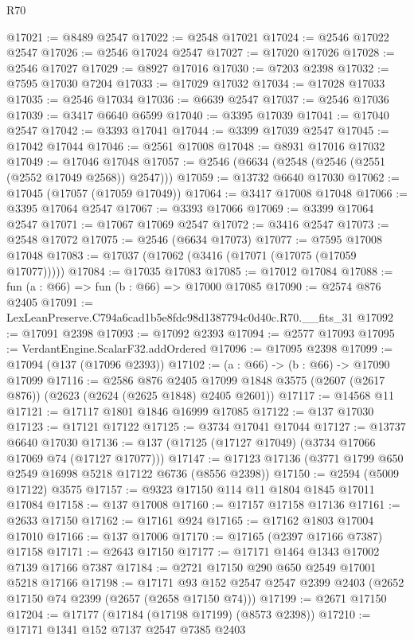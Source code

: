 \begin{lexlean}{R70}
\begin{coremodule}
@17021 := @8489 @2547
@17022 := @2548 @17021
@17024 := @2546 @17022 @2547
@17026 := @2546 @17024 @2547
@17027 := @17020 @17026
@17028 := @2546 @17027
@17029 := @8927 @17016
@17030 := @7203 @2398
@17032 := @7595 @17030 @7204
@17033 := @17029 @17032
@17034 := @17028 @17033
@17035 := @2546 @17034
@17036 := @6639 @2547
@17037 := @2546 @17036
@17039 := @3417 @6640 @6599
@17040 := @3395 @17039
@17041 := @17040 @2547
@17042 := @3393 @17041
@17044 := @3399 @17039 @2547
@17045 := @17042 @17044
@17046 := @2561 @17008
@17048 := @8931 @17016 @17032
@17049 := @17046 @17048
@17057 := @2546 (@6634 (@2548 (@2546 (@2551 (@2552 @17049 @2568)) @2547)))
@17059 := @13732 @6640 @17030
@17062 := @17045 (@17057 (@17059 @17049))
@17064 := @3417 @17008 @17048
@17066 := @3395 @17064 @2547
@17067 := @3393 @17066
@17069 := @3399 @17064 @2547
@17071 := @17067 @17069 @2547
@17072 := @3416 @2547
@17073 := @2548 @17072
@17075 := @2546 (@6634 @17073)
@17077 := @7595 @17008 @17048
@17083 := @17037 (@17062 (@3416 (@17071 (@17075 (@17059 @17077)))))
@17084 := @17035 @17083
@17085 := @17012 @17084
@17088 := fun (a : @66) => fun (b : @66) => @17000 @17085
@17090 := @2574 @876 @2405
@17091 := LexLeanPreserve.C794a6cad1b5e8fdc98d1387794c0d40c.R70.__fits_31
@17092 := @17091 @2398
@17093 := @17092 @2393
@17094 := @2577 @17093
@17095 := VerdantEngine.ScalarF32.addOrdered
@17096 := @17095 @2398
@17099 := @17094 (@137 (@17096 @2393))
@17102 := (a : @66) -> (b : @66) -> @17090 @17099
@17116 := @2586
    @876
    @2405
    @17099
    @1848
    @3575
    (@2607 (@2617 @876))
    (@2623 (@2624 (@2625 @1848) @2405 @2601))
@17117 := @14568 @11
@17121 := @17117 @1801 @1846 @16999 @17085
@17122 := @137 @17030
@17123 := @17121 @17122
@17125 := @3734 @17041 @17044
@17127 := @13737 @6640 @17030
@17136 := @137 (@17125 (@17127 @17049) (@3734 @17066 @17069 @74 (@17127 @17077)))
@17147 := @17123 @17136 (@3771 @1799 @650 @2549 @16998 @5218 @17122 @6736 (@8556 @2398))
@17150 := @2594 (@5009 @17122) @3575
@17157 := @9323 @17150 @114 @11 @1804 @1845 @17011 @17084
@17158 := @137 @17008
@17160 := @17157 @17158 @17136
@17161 := @2633 @17150
@17162 := @17161 @924
@17165 := @17162 @1803 @17004 @17010
@17166 := @137 @17006
@17170 := @17165 (@2397 @17166 @7387) @17158
@17171 := @2643 @17150
@17177 := @17171 @1464 @1343 @17002 @7139 @17166 @7387
@17184 := @2721 @17150 @290 @650 @2549 @17001 @5218 @17166
@17198 := @17171
    @93
    @152
    @2547
    @2547
    @2399
    @2403
    (@2652 @17150 @74 @2399 (@2657 (@2658 @17150 @74)))
@17199 := @2671 @17150
@17204 := @17177 (@17184 (@17198 @17199) (@8573 @2398))
@17210 := @17171 @1341 @152 @7137 @2547 @7385 @2403

\end{coremodule}
\end{lexlean}
